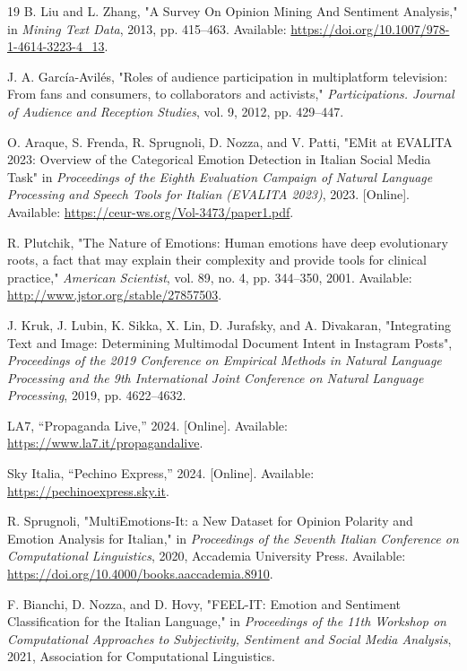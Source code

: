 \documentclass[letterpaper,journal]{IEEEtran}
\begin{document}
\begin{thebibliography}{19}
 B. Liu and L. Zhang, "A Survey On Opinion Mining And Sentiment Analysis," in \textit{Mining Text Data}, 2013, pp. 415--463. Available: \url{https://doi.org/10.1007/978-1-4614-3223-4_13}.

 J. A. Garc\'ia-Avil\'es, "Roles of audience participation in multiplatform television: From fans and consumers, to collaborators and activists," \textit{Participations. Journal of Audience and Reception Studies}, vol. 9, 2012, pp. 429--447.

 O. Araque, S. Frenda, R. Sprugnoli, D. Nozza, and V. Patti, "EMit at EVALITA 2023: Overview of the Categorical Emotion Detection in Italian Social Media Task" in \textit{Proceedings of the Eighth Evaluation Campaign of Natural Language Processing and Speech Tools for Italian (EVALITA 2023)}, 2023. [Online]. Available: \url{https://ceur-ws.org/Vol-3473/paper1.pdf}.

 R. Plutchik, "The Nature of Emotions: Human emotions have deep evolutionary roots, a fact that may explain their complexity and provide tools for clinical practice," \textit{American Scientist}, vol. 89, no. 4, pp. 344--350, 2001. Available: \url{http://www.jstor.org/stable/27857503}.

 J. Kruk, J. Lubin, K. Sikka, X. Lin, D. Jurafsky, and A. Divakaran, "Integrating Text and Image: Determining Multimodal Document Intent in Instagram Posts", \textit{Proceedings of the 2019 Conference on Empirical Methods in Natural Language Processing and the 9th International Joint Conference on Natural Language Processing}, 2019, pp. 4622--4632.

 LA7, ``Propaganda Live,'' 2024. [Online]. Available: \url{https://www.la7.it/propagandalive}.

 Sky Italia, ``Pechino Express,'' 2024. [Online]. Available: \url{https://pechinoexpress.sky.it}.

 R. Sprugnoli, "MultiEmotions-It: a New Dataset for Opinion Polarity and Emotion Analysis for Italian," in \textit{Proceedings of the Seventh Italian Conference on Computational Linguistics}, 2020, Accademia University Press. Available: \url{https://doi.org/10.4000/books.aaccademia.8910}.

 F. Bianchi, D. Nozza, and D. Hovy, "FEEL-IT: Emotion and Sentiment Classification for the Italian Language," in \textit{Proceedings of the 11th Workshop on Computational Approaches to Subjectivity, Sentiment and Social Media Analysis}, 2021, Association for Computational Linguistics.


\end{thebibliography}
\end{document}
